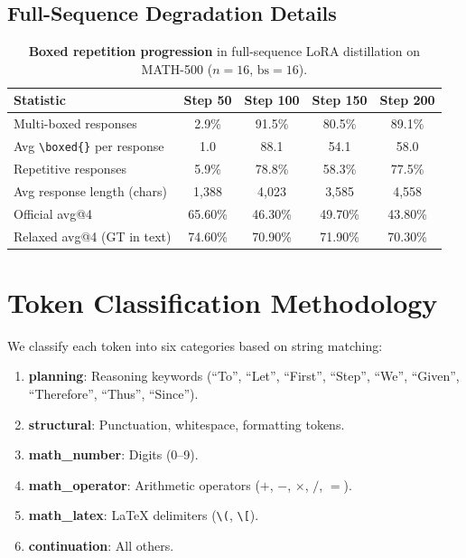 \documentclass[10pt]{article}
\newcommand{\bboxed}{\texttt{\textbackslash boxed\{\}}}
\begin{document}
\subsection{Full-Sequence Degradation Details}
\label{app:fullseq_degradation}

\begin{table}[!htbp]
\centering
\caption{\textbf{Boxed repetition progression} in full-sequence LoRA distillation on MATH-500 ($n{=}16$, $\text{bs}{=}16$).}
\label{tab:app_boxed}
\small
\begin{tabular}{lcccc}
\toprule
\textbf{Statistic} & \textbf{Step 50} & \textbf{Step 100} & \textbf{Step 150} & \textbf{Step 200} \\
\midrule
Multi-boxed responses & 2.9\% & 91.5\% & 80.5\% & 89.1\% \\
Avg \bboxed{} per response & 1.0 & 88.1 & 54.1 & 58.0 \\
Repetitive responses & 5.9\% & 78.8\% & 58.3\% & 77.5\% \\
Avg response length (chars) & 1,388 & 4,023 & 3,585 & 4,558 \\
\midrule
Official avg@4 & 65.60\% & 46.30\% & 49.70\% & 43.80\% \\
Relaxed avg@4 (GT in text) & 74.60\% & 70.90\% & 71.90\% & 70.30\% \\
\bottomrule
\end{tabular}
\end{table}


\section{Token Classification Methodology}
\label{app:token_classification}

We classify each token into six categories based on string matching:
\begin{enumerate}
    \item \textbf{planning}: Reasoning keywords (``To'', ``Let'', ``First'', ``Step'', ``We'', ``Given'', ``Therefore'', ``Thus'', ``Since'').
    \item \textbf{structural}: Punctuation, whitespace, formatting tokens.
    \item \textbf{math\_number}: Digits (0--9).
    \item \textbf{math\_operator}: Arithmetic operators ($+$, $-$, $\times$, $/$, $=$).
    \item \textbf{math\_latex}: LaTeX delimiters (\texttt{\textbackslash(}, \texttt{\textbackslash[}).
    \item \textbf{continuation}: All others.
\end{enumerate}
\end{document}
